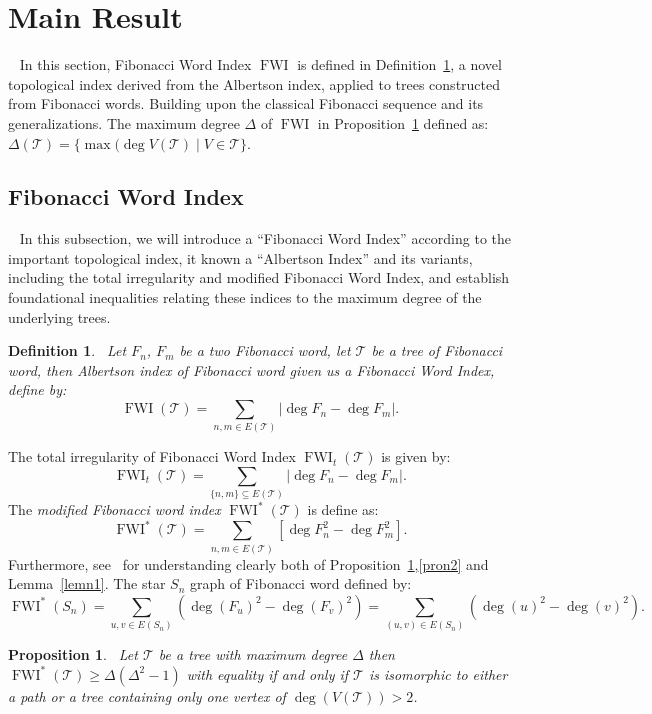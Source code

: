 \documentclass[12pt, a4paper]{article}
\newtheorem{proposition}{Proposition}[section]
\newtheorem{definition}{Definition}
\begin{document}
\section{Main Result}~\label{sec3}
In this section, Fibonacci Word Index $\operatorname{FWI}$ is defined in Definition~\ref{defn1}, a novel topological index derived from the Albertson index, applied to trees constructed from Fibonacci words. Building upon the classical Fibonacci sequence and its generalizations. The maximum degree $\Delta$ of $\operatorname{FWI}$ in Proposition~\ref{pron1} defined as: $\Delta(\mathscr{T})=\{\max(\deg V(\mathscr{T}) \mid V\in \mathscr{T}\}$. 
\subsection{Fibonacci Word Index}~\label{subsec3}
In this subsection, we will introduce a ``Fibonacci Word Index'' according to the important topological index, it known a ``Albertson Index'' and its variants, including the total irregularity and modified Fibonacci Word Index, and establish foundational inequalities relating these indices to the maximum degree of the underlying trees. 
\begin{definition}~\label{defn1}
Let $F_n$, $F_m$ be a two Fibonacci word, let $\mathscr{T}$ be a tree of Fibonacci word, then Albertson index of Fibonacci word given us a Fibonacci Word Index, define by: 
\[
\operatorname{FWI}(\mathscr{T})=\sum_{n,m\in E(\mathscr{T})}\lvert \deg F_n-\deg F_m\rvert.
\]
\end{definition}
\noindent
The total irregularity of Fibonacci Word Index $\operatorname{FWI}_t(\mathscr{T})$ is given by: 
\[
\operatorname{FWI}_t(\mathscr{T})=\sum_{\{n,m\}\subseteq E(\mathscr{T})}\lvert \deg F_n-\deg F_m\rvert.
\]
The \textit{modified Fibonacci word index} $\operatorname{FWI}^*(\mathscr{T})$ is define as:
\[
\operatorname{FWI}^*(\mathscr{T})=\sum_{n,m\in E(\mathscr{T})}[\deg F_n^2-\deg F_m^2].
\]
Furthermore, see~\cite{YousafBhattiAli} for understanding clearly both of Proposition~\ref{pron1},\ref{pron2} and Lemma~\ref{lemn1}. The star $S_n$ graph of Fibonacci word defined by: 
\[
\operatorname{FWI}^*(S_n) = \sum_{u,v \in E(S_n)} \left( \deg(F_u)^2 - \deg(F_v)^2 \right) =\sum_{(u,v) \in E(S_n)} \left( \deg(u)^2 - \deg(v)^2 \right).
\]
\begin{proposition}~\label{pron1}
Let $\mathscr{T}$ be a tree with maximum degree $\Delta$ then $\operatorname{FWI}^*(\mathscr{T})\ge \Delta(\Delta^2 - 1)$ with equality if and only if $\mathscr{T}$ is isomorphic to either a path or a tree containing only one vertex of $\deg (V(\mathscr{T}))>2$.
\end{proposition}
\end{document}
